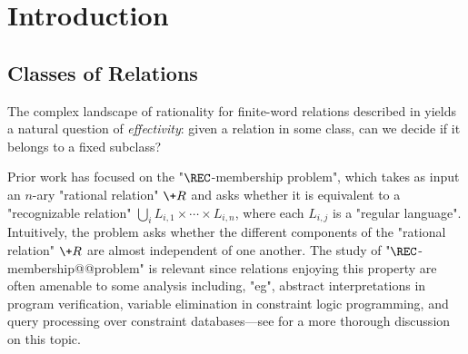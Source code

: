 \section{Introduction}
\label{sec:dichotomy-introduction}


\subsection{Classes of Relations}
\label{sec:dichotomy-introduction-relations}

The complex landscape of rationality for finite-word relations 
described in 
yields a natural question of \emph{effectivity}: given a relation in some class,
can we decide if it belongs to a fixed subclass? 


Prior work has focused on the "$\REC$-membership problem", 
which takes as input an $n$-ary "rational relation"
$\+R$ and asks whether it is equivalent to a "recognizable relation"
$\bigcup_i L_{i,1} \times \cdots \times L_{i,n}$, where each $L_{i,j}$ is a "regular language". 
Intuitively, the problem asks whether the different components of  
the "rational relation" $\+R$ are almost independent of one another.
The study of "$\REC$-membership@@problem"
is relevant since relations enjoying this property are often amenable to some analysis including,
"eg", abstract interpretations in program verification, variable elimination in constraint logic 
programming, and query processing over constraint databases---see \cite[Introduction]{BarceloHongLeLinNiskanen2019MonadicDecomposability} for a more thorough discussion on this topic.

